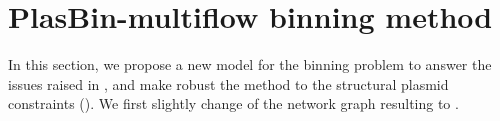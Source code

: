 \section{PlasBin-multiflow binning method}\label{sec:pbmf}

In this section, we propose a new model for the binning problem to answer the issues raised in , and make robust the method to the structural plasmid constraints ().
We first slightly change  of the network graph resulting to .




